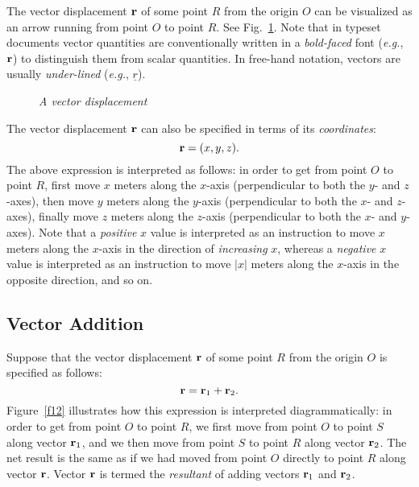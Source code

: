 The vector displacement ${\bf r}$ of some point $R$ from the origin $O$
can be visualized as an arrow running from point $O$ to point $R$. See Fig.~\ref{f11}.
Note that in typeset documents vector quantities are conventionally written in a {\em bold-faced} font
({\em e.g.}, ${\bf r}$) to
distinguish them from scalar quantities. In free-hand notation, vectors are usually
{\em under-lined} ({\em e.g.}, $\underline{r}$). 

\begin{figure}
\epsfysize=2in
\centerline{}
\caption{\em A vector displacement}\label{f11}   
\end{figure}

The vector displacement ${\bf r}$ can also be specified in terms of its {\em coordinates}:
\begin{equation}
{\bf r} = (x, y, z).
\end{equation}
The above expression is interpreted as follows: in order to get from point $O$ to
point $R$, first move $x$ meters along the $x$-axis (perpendicular to both the $y$- and $z$-axes),
then move $y$ meters along the $y$-axis (perpendicular to both the $x$- and $z$-axes),
finally move $z$ meters along the $z$-axis (perpendicular to both the $x$- and $y$-axes).
Note that a {\em positive}  $x$ value is interpreted as an instruction to move $x$ meters
along the $x$-axis in the direction of {\em increasing} $x$, whereas
 a {\em negative} $x$ value is interpreted as an 
instruction to move $|x|$ meters
 along the $x$-axis in the opposite direction, and so on.

\subsection{Vector Addition}
Suppose that the vector displacement 
 ${\bf r}$ of some point $R$ from the origin $O$ is specified as follows:
\begin{equation}
{\bf r} = {\bf r}_1 + {\bf r}_2.
\end{equation}
Figure~\ref{f12} illustrates how this expression is interpreted diagrammatically: in order to
get from point $O$ to point $R$, we first move from point $O$ to point $S$ along vector
${\bf r}_1$, and we then move from point $S$ to point $R$ along vector ${\bf r}_2$. The
net result is the same as if we had moved from point $O$ directly to point $R$ along
vector ${\bf r}$. Vector ${\bf r}$ is termed the {\em resultant} of adding vectors
${\bf r}_1$ and ${\bf r}_2$. 


